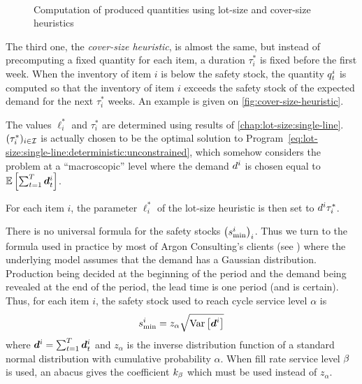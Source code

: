\begin{figure}[h]
  \centering
  \\
  \caption{Computation of produced quantities using lot-size and cover-size heuristics}
  \label{fig:lot-and-cover-size-heuristics}
\end{figure}

The third one, the {\em cover-size heuristic}, is almost the same, but instead of precomputing a fixed quantity for each item, a duration $\tau_i^*$ is fixed before the first week.
When the inventory of item $i$ is below the safety stock, the quantity $q_t^i$ is computed so that the inventory of item $i$ exceeds the safety stock of the expected demand for the next $\tau_i^*$ weeks.
An example is given on \cref{fig:cover-size-heuristic}.


The values $\ell_i^*$ and $\tau_i^*$ are determined using results of \cref{chap:lot-size:single-line}.
$(\tau_i^*)_{i\in\mathcal{I}}$ is actually chosen to be the optimal solution to Program~\eqref{eq:lot-size:single-line:deterministic:unconstrained}, which somehow considers the problem at a ``macroscopic'' level
where the demand $d^i$ is chosen equal to $\espe\sqbracket{\sum_{t=1}^{\horizon}\va d_t^i}$.


For each item $i$, the parameter $\ell_i^*$ of the lot-size heuristic is then set to $d^i\tau_i^*$.


There is no universal formula for the safety stocks $\bracket{\safety^i}_i$.
Thus we turn to the formula used in practice by most of Argon Consulting's clients (see \citet[Chapter 11]{Arnold2007}) where the underlying model assumes that the demand has a Gaussian distribution.
Production being decided at the beginning of the period and the demand being revealed at the end of the period, the lead time is one period (and is certain).
Thus, for each item $i$, the safety stock used to reach cycle service level $\alpha$ is
\begin{equation}\label{eq:PDP:numerical-experiments:safety-stock}
  \safety^i = z_{\alpha} \sqrt{\vari\sqbracket{\va\demand^i}}
\end{equation}
where $\va\demand^i=\sum_{t=1}^{\horizon}\va\demand_t^i$ and $z_{\alpha}$ is the inverse distribution function of a standard normal distribution with cumulative probability $\alpha$.
When fill rate service level $\beta$ is used, an abacus gives the coefficient $k_{\beta}$ which must be used instead of $z_{\alpha}$.


